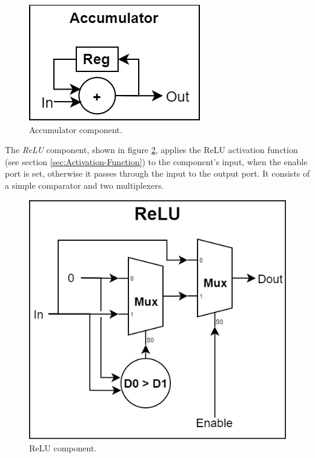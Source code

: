 \begin{figure} [H]
	\centering
	\includegraphics[scale=0.4]{../Images/Platform/Accumulator_component.png}
	\decoRule
	\caption[Accumulator component]{Accumulator component.}
	\label{fig:accumulator-component}
\end{figure}

The \emph{ReLU} component, shown in figure \ref{fig:relu-component}, applies the ReLU activation function (see section \ref{sec:Activation-Function}) to the component's input, when the enable port is set, otherwise it passes through the input to the output port. It consists of a simple comparator and two multiplexers.

\begin{figure} [H]
	\centering
	\includegraphics[scale=0.4]{../Images/Platform/ReLU_component.png}
	\decoRule
	\caption[ReLU component]{ReLU component.}
	\label{fig:relu-component}
\end{figure}

